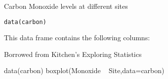 \begin{Description}\relax
Carbon Monoxide levels at different sites
\end{Description}
\begin{Usage}
\begin{verbatim}data(carbon)\end{verbatim}
\end{Usage}
\begin{Format}\relax
This data frame contains the following columns:
\end{Format}
\begin{Source}\relax
Borrowed from Kitchen's Exploring Statistics
\end{Source}
\begin{Examples}
\begin{ExampleCode}
data(carbon)
boxplot(Monoxide ~ Site,data=carbon)
\end{ExampleCode}
\end{Examples}

